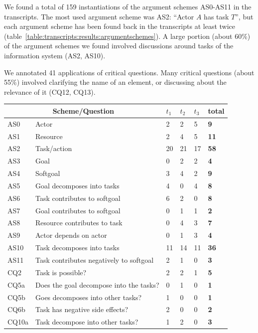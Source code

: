 We found a total of 159 instantiations of the argument schemes AS0-AS11 in the transcripts. The most used argument scheme was AS2: ``Actor $A$ has task $T$'', but each argument scheme has been found back in the transcripts at least twice (table~\ref{table:transcripts:results:argumentschemes}). A large portion (about 60\%) of the argument schemes we found involved discussions around tasks of the information system (AS2, AS10).

We annotated 41 applications of critical questions. Many critical questions (about 55\%) involved clarifying the name of an element, or discussing about the relevance of it (CQ12, CQ13).

\begin{table}[ht]
\centering
\begin{tabularx}{0.5\textwidth}{|l|X|l|l|l|>{\bfseries}l|}
\hline
\multicolumn{2}{|c|}{\textbf{Scheme/Question}} & $t_1$ & $t_2$ & $t_3$ & \textbf{total}\\
\hline 
AS0 & Actor & 2 & 2 & 5 & 9\\
\hline
AS1 & Resource & 2 & 4 & 5 & 11\\
\hline
AS2 & Task/action & 20 & 21 & 17 & 58\\
\hline
AS3 & Goal & 0 & 2 & 2 & 4\\
\hline
AS4 & Softgoal & 3 & 4 & 2 & 9\\
\hline
AS5 & Goal decomposes into tasks & 4 &0& 4 & 8\\
\hline
AS6 & Task contributes to softgoal & 6 & 2 &0& 8\\
\hline
AS7 & Goal contributes to softgoal &0& 1 & 1 & 2\\
\hline
AS8 & Resource contributes to task & 0 & 4 & 3 & 7\\
\hline
AS9 & Actor depends on actor &0& 1 & 3 & 4\\
\hline
AS10 & Task decomposes into tasks & 11 &14 &11 &36\\ 
\hline
AS11 & Task contributes negatively to softgoal & 2 & 1 & 0 & 3\\
\hline
\hline
CQ2 & Task is possible? & 2 & 2 & 1 & 5\\
\hline		
CQ5a & Does the goal decompose into the tasks? & 0 & 1 & 0 & 1\\
\hline
CQ5b & Goes decomposes into other tasks? & 1 & 0 & 0 & 1\\
\hline
CQ6b & Task has negative side effects? & 2 & 0 & 0 & 2\\
\hline
CQ10a & Task decompose into other tasks? & 1 &2 &0&3\\

\end{tabularx}
\end{table}

